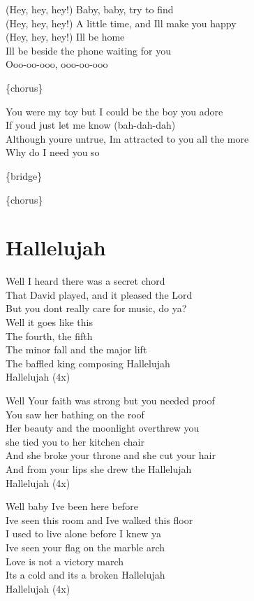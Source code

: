 \documentclass[
  letterpaper,
  twoside=false]{scrbook}
\begin{document}
(Hey, hey, hey!) Baby, baby, try to find\\
(Hey, hey, hey!) A little time, and I\textquotesingle ll make you
happy\\
(Hey, hey, hey!) I\textquotesingle ll be home\\
I\textquotesingle ll be beside the phone waiting for you\\
Ooo-oo-ooo, ooo-oo-ooo

\{chorus\}

You were my toy but I could be the boy you adore\\
If you\textquotesingle d just let me know (bah-dah-dah)\\
Although you\textquotesingle re untrue, I\textquotesingle m attracted to
you all the more\\
Why do I need you so

\{bridge\}

\{chorus\}

\hypertarget{hallelujah}{%
\chapter{Hallelujah}\label{hallelujah}}

Well I heard there was a secret chord\\
That David played, and it pleased the Lord\\
But you don\textquotesingle t really care for music, do ya?\\
Well it goes like this\\
The fourth, the fifth\\
The minor fall and the major lift\\
The baffled king composing Hallelujah\\
Hallelujah (4x)

Well Your faith was strong but you needed proof\\
You saw her bathing on the roof\\
Her beauty and the moonlight overthrew you\\
she tied you to her kitchen chair\\
And she broke your throne and she cut your hair\\
And from your lips she drew the Hallelujah\\
Hallelujah (4x)

Well baby I\textquotesingle ve been here before\\
I\textquotesingle ve seen this room and I\textquotesingle ve walked this
floor\\
I used to live alone before I knew ya\\
I\textquotesingle ve seen your flag on the marble arch\\
Love is not a victory march\\
It\textquotesingle s a cold and it\textquotesingle s a broken
Hallelujah\\
Hallelujah (4x)
\end{document}
